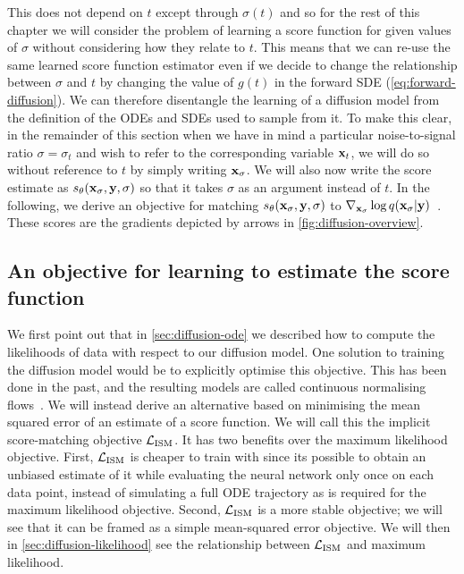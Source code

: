 This does not depend on $t$ except through $\sigma(t)$ and so for the rest of this chapter we will consider the problem of learning a score function for given values of $\sigma$ without considering how they relate to $t$. This means that we can re-use the same learned score function estimator even if we decide to change the relationship between $\sigma$ and $t$ by changing the value of $g(t)$ in the forward SDE (\cref{eq:forward-diffusion}). We can therefore disentangle the learning of a diffusion model from the definition of the ODEs and SDEs used to sample from it. To make this clear, in the remainder of this section when we have in mind a particular noise-to-signal ratio $\sigma=\sigma_t$ and wish to refer to the corresponding variable ${\mathbf{x}}_t$, we will do so without reference to $t$ by simply writing ${\mathbf{x}}_\sigma$. We will also now write the score estimate as $s_\theta({\mathbf{x}}_\sigma, {\mathbf{y}}, \sigma)$ so that it takes $\sigma$ as an argument instead of $t$. In the following, we derive an objective for matching $s_\theta({\mathbf{x}}_\sigma, {\mathbf{y}}, \sigma)$ to $\nabla_{{\mathbf{x}}_\sigma} \log q({\mathbf{x}}_\sigma |{\mathbf{y}})$~\citep{vincent2011connection,song2019generative}. These scores are the gradients depicted by arrows in \cref{fig:diffusion-overview}.

\subsection{An objective for learning to estimate the score function}

We first point out that in \cref{sec:diffusion-ode} we described how to compute the likelihoods of data with respect to our diffusion model. One solution to training the diffusion model would be to explicitly optimise this objective. This has been done in the past, and the resulting models are called continuous normalising flows~\cite{chen2018neural}. We will instead derive an alternative based on minimising the mean squared error of an estimate of a score function. We will call this the implicit score-matching objective ${\mathcal{L}}_\text{ISM}$. It has two benefits over the maximum likelihood objective. First, ${\mathcal{L}}_\text{ISM}$ is cheaper to train with since its possible to obtain an unbiased estimate of it while evaluating the neural network only once on each data point, instead of simulating a full ODE trajectory as is required for the maximum likelihood objective. Second, ${\mathcal{L}}_\text{ISM}$ is a more stable objective; we will see that it can be framed as a simple mean-squared error objective. We will then in \cref{sec:diffusion-likelihood} see the relationship between ${\mathcal{L}}_\text{ISM}$ and maximum likelihood.

